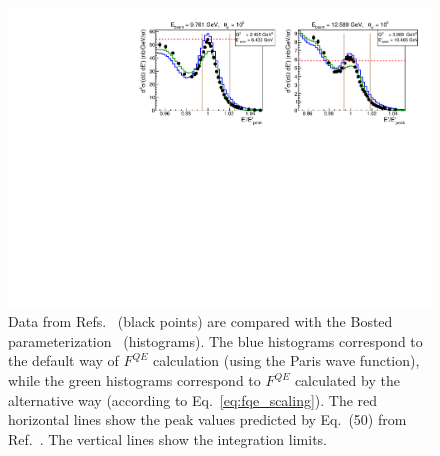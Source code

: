 \afterpage{\clearpage}
\begin{figure}[htp]
\begin{center}
\includegraphics[width=14cm]{pictures/rock.pdf}
\caption{\small Data from Refs.~\cite{Rock:1991jy,Rock_SLAC} (black points) are compared with the Bosted parameterization~\cite{Bosted_fit,Bosted:2007xd} (histograms). The blue histograms correspond to the default way of $F^{QE}$ calculation (using the Paris wave function), while the green histograms correspond to $F^{QE}$ calculated by the alternative way (according to Eq.~\eqref{eq:fqe_scaling}). The red horizontal lines show the peak values predicted by Eq.~(50) from Ref.~\cite{Kocevar:1967}. The vertical lines show the integration limits.  } \label{fig:rock_QE}
\end{center}
\end{figure}
